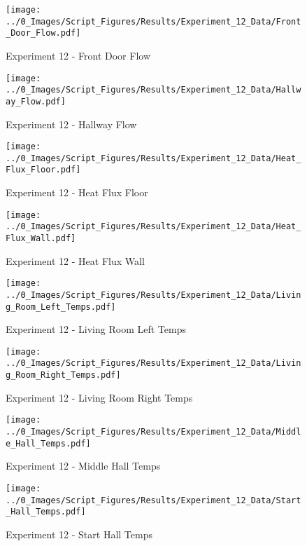 	\clearpage

	\begin{figure}[H]
		\centering
		\texttt{[image: ../0\_Images/Script\_Figures/Results/Experiment\_12\_Data/Front\_Door\_Flow.pdf]}
		\caption[]{Experiment 12 - Front Door Flow}
	\end{figure}
 

	\begin{figure}[H]
		\centering
		\texttt{[image: ../0\_Images/Script\_Figures/Results/Experiment\_12\_Data/Hallway\_Flow.pdf]}
		\caption[]{Experiment 12 - Hallway Flow}
	\end{figure}
 
	\clearpage

	\begin{figure}[H]
		\centering
		\texttt{[image: ../0\_Images/Script\_Figures/Results/Experiment\_12\_Data/Heat\_Flux\_Floor.pdf]}
		\caption[]{Experiment 12 - Heat Flux Floor}
	\end{figure}
 

	\begin{figure}[H]
		\centering
		\texttt{[image: ../0\_Images/Script\_Figures/Results/Experiment\_12\_Data/Heat\_Flux\_Wall.pdf]}
		\caption[]{Experiment 12 - Heat Flux Wall}
	\end{figure}
 
	\clearpage

	\begin{figure}[H]
		\centering
		\texttt{[image: ../0\_Images/Script\_Figures/Results/Experiment\_12\_Data/Living\_Room\_Left\_Temps.pdf]}
		\caption[]{Experiment 12 - Living Room Left Temps}
	\end{figure}
 

	\begin{figure}[H]
		\centering
		\texttt{[image: ../0\_Images/Script\_Figures/Results/Experiment\_12\_Data/Living\_Room\_Right\_Temps.pdf]}
		\caption[]{Experiment 12 - Living Room Right Temps}
	\end{figure}
 
	\clearpage

	\begin{figure}[H]
		\centering
		\texttt{[image: ../0\_Images/Script\_Figures/Results/Experiment\_12\_Data/Middle\_Hall\_Temps.pdf]}
		\caption[]{Experiment 12 - Middle Hall Temps}
	\end{figure}
 

	\begin{figure}[H]
		\centering
		\texttt{[image: ../0\_Images/Script\_Figures/Results/Experiment\_12\_Data/Start\_Hall\_Temps.pdf]}
		\caption[]{Experiment 12 - Start Hall Temps}
	\end{figure}
 
